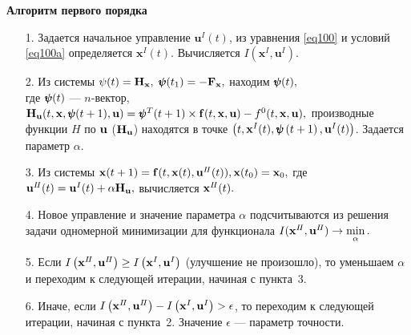 \documentclass[10pt]{beamer}
\begin{document}
\begin{frame}[shrink]{\textbf{Алгоритм первого порядка} }
\begin{enumerate}
 \item[1.] Задается начальное управление $\mathbf{u}^I(t)$, из уравнения \eqref{eq100} и условий \eqref{eq100a} определяется $\mathbf{x}^I(t)$. Вычисляется $I(\mathbf{x}^I,\mathbf{u}^I).$
 \item[2.] Из системы $\mathbf{\psi}(t)=\mathbf{H}_\mathbf{x},\;\psi\hspace{-.68em}\psi\hspace{-.68em}\psi(t_1)=-\mathbf{F}_{\mathbf{x}},$ находим $\psi\hspace{-.68em}\psi\hspace{-.68em}\psi(t),$\\ где $\psi\hspace{-.68em}\psi\hspace{-.68em}\psi(t)$ --- $n$-вектор, $\H_\u(t,\x,\bpsi(t+1),\u)=\bpsi^{T}(t+1)\times\f(t,\x,\u)-f^{0}(t,\x,\u),$ производные функции $H$ по $\mathbf{u}$ ($\mathbf{H}_{\mathbf{u}}$) находятся в точке $\left(t,\mathbf{x}^{I}(t),\psi\hspace{-.68em}\psi\hspace{-.68em}\psi \left(t+1 \right),\mathbf{u}^{I}(t)\right)$. Задается параметр $\alpha$.
 \item[3.] Из системы $\mathbf{x}(t+1)=\mathbf{f}(t,\mathbf{x}(t),\mathbf{u}^{I\!I}(t)), \mathbf{x}(t_0)=\mathbf{x}_0,$ где $\mathbf{u}^{I\!I}(t)=\mathbf{u}^{I}(t)+\alpha \mathbf{H}_{\mathbf{u}},$ вычисляется $\mathbf{x}^{I\!I}(t).$
 \item[4.] Новое управление и значение параметра $\alpha$ подсчитываются из решения задачи одномерной минимизации для функционала $I(\mathbf{x}^{I\!I},\mathbf{u}^{I\!I})\to \min\limits_{\alpha}.$
 \item[5.] Если $I\left(\mathbf{x}^{I\!I},\mathbf{u}^{I\!I}\right)\geq I\left(\mathbf{x}^{I},\mathbf{u}^{I}\right)$ (улучшение не произошло), то уменьшаем $\alpha$ и переходим к следующей итерации, начиная с пункта~3.
 \item[6.] Иначе, если $I\left(\mathbf{x}^{I\!I},\mathbf{u}^{I\!I}\right) - I\left(\mathbf{x}^{I},\mathbf{u}^{I}\right)>\epsilon$, то переходим к следующей итерации, начиная с пункта~2. Значение $\epsilon$ --- параметр точности.
\end{enumerate}
\end{frame}
\end{document}
